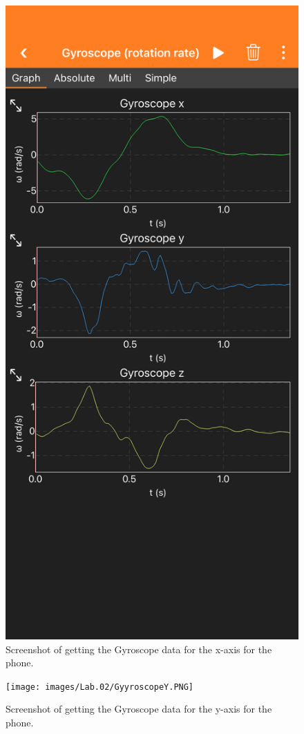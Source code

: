 \documentclass[idxtotoc,hyperref,openany]{labbook} %
\begin{document}
\begin{figure}[H] %
\begin{center}
\includegraphics[width=.7\linewidth]{images/Lab.02/GyyroscopeX.PNG}
\end{center}
\caption{Screenshot of getting the Gyroscope data for the x-axis for the phone.}
\label{fig:Lab02-GyroscopeX}
\end{figure}

\begin{figure}[H] %
\begin{center}
\texttt{[image: images/Lab.02/GyyroscopeY.PNG]}
\end{center}
\caption{Screenshot of getting the Gyroscope data for the y-axis for the phone.}
\label{fig:Lab02-GyroscopeY}
\end{figure}
\end{document}

